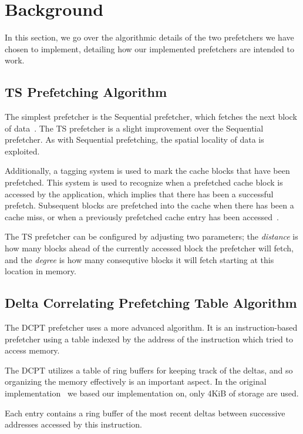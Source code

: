 \section{Background}

In this section, we go over the algorithmic details of the two prefetchers we
have chosen to implement, detailing how our implemented prefetchers are intended
to work.

\subsection{TS Prefetching Algorithm}

The simplest prefetcher is the Sequential prefetcher, which fetches the next
block of data~\cite{seq}. The TS prefetcher is a slight improvement over the
Sequential prefetcher. As with Sequential prefetching, the spatial locality of
data is exploited.

Additionally, a tagging system is used to mark the cache blocks that have been
prefetched. This system is used to recognize when a prefetched cache block is
accessed by the application, which implies that there has been a successful
prefetch. Subsequent blocks are prefetched into the cache when there has been a
cache miss, or when a previously prefetched cache entry has been
accessed~\cite{grannaes}.

The TS prefetcher can be configured by adjusting two parameters; the
\emph{distance} is how many blocks ahead of the currently accessed block the
prefetcher will fetch, and the \emph{degree} is how many consequtive blocks it
will fetch starting at this location in memory.

\subsection{Delta Correlating Prefetching Table Algorithm}

The DCPT prefetcher uses a more advanced algorithm. It is an instruction-based
prefetcher using a table indexed by the address of the instruction which tried
to access memory.

The DCPT utilizes a table of ring buffers for keeping track of the deltas, and
so organizing the memory effectively is an important aspect. In the original
implementation~\cite{dcpt} we based our implementation on, only 4KiB of storage
are used.

Each entry contains a ring buffer of the most recent deltas between successive
addresses accessed by this instruction.

